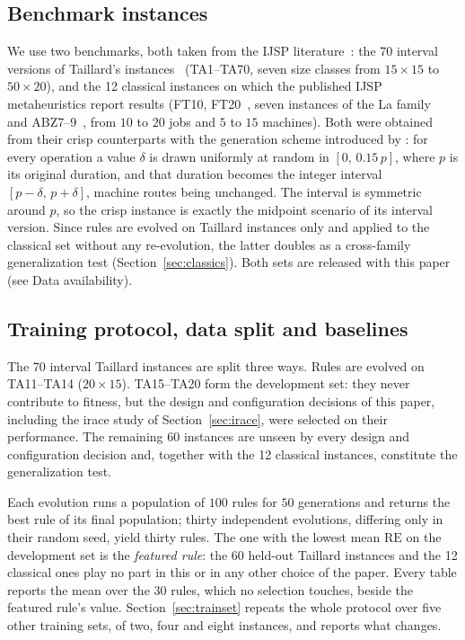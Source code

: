 \documentclass[review,authoryear,11pt]{elsarticle}
\newcommand{\rev}[1]{\textcolor{revcolor}{#1}}
\newcommand{\RE}{\mathrm{RE}}
\begin{document}
\subsection{Benchmark instances}
\label{sec:instances}
We use two benchmarks, both taken from the IJSP
literature~\citep{DiazGA2020,DiazFEABC2023,DiazICAE2023}: the 70 interval
versions of Taillard's instances~\citep{Taillard1993} (TA1--TA70, seven size classes from
$15{\times}15$ to $50{\times}20$), and the 12 classical instances on
which the published IJSP metaheuristics report results (FT10, FT20~\citep{FisherThompson1963}, seven
instances of the La family~\citep{Lawrence1984} and ABZ7--9~\citep{Adams1988}, from $10$ to $20$ jobs and $5$ to
$15$ machines). Both were obtained from their crisp counterparts with
the generation scheme introduced by \citet{DiazGA2020}: for every
operation a value $\delta$ is drawn uniformly at random in
$[0,\, 0.15\,p]$, where $p$ is its original duration, and that duration
becomes the integer interval $[p-\delta,\, p+\delta]$, machine routes
being unchanged. The interval is symmetric around $p$, so the crisp
instance is exactly the midpoint scenario of its interval version. Since
rules are evolved on Taillard instances only and applied to the
classical set without any re-evolution, the latter doubles as a
cross-family generalization test (Section~\ref{sec:classics}). Both sets
are released with this paper (see Data availability).

\subsection{Training protocol, data split and baselines}
The 70 interval Taillard instances are split three ways. Rules are
evolved on TA11--TA14 ($20{\times}15$). TA15--TA20 form the
development set: they never contribute to fitness, but the design and
configuration decisions of this paper, including the irace study of
Section~\ref{sec:irace}, were selected on their performance. The
remaining 60 instances are unseen by every design and configuration
decision and, together with the 12 classical instances, constitute the
generalization test.

Each evolution runs a population of $100$ rules for $50$ generations
and returns the best rule of its final population; thirty independent
evolutions, differing only in their random seed, yield thirty rules.
The one with the lowest mean $\RE$ on the development set is the
\emph{featured rule}: the 60 held-out Taillard instances and the 12
classical ones play no part in this or in any other choice of the
paper. Every table reports the mean over the 30 rules, which no
selection touches, beside the featured rule's value.
\rev{Section~\ref{sec:trainset} repeats the whole protocol over five
other training sets, of two, four and eight instances, and reports what
changes.}
\end{document}
